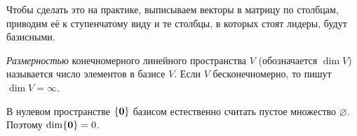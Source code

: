 \begin{remark}
    Чтобы сделать это на практике, выписываем векторы в матрицу по столбцам, приводим её к ступенчатому виду и те столбцы, в которых стоят лидеры, будут базисными.
\end{remark}

\begin{definition}
    \textit{Размерностью} конечномерного линейного пространства $V$ (обозначается $\dim V$) называется число элементов в базисе $V$. Если $V$ бесконечномерно, то пишут $\dim V = \infty$.
\end{definition}

\begin{remark}
    В нулевом пространстве $\{\boldsymbol{0}\}$ базисом естественно считать пустое множество $\varnothing$. Поэтому $\dim\{\boldsymbol{0}\} = 0$.
\end{remark}

